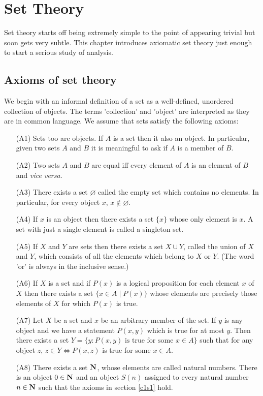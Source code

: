 \chapter{Set Theory}\label{c2}

Set theory starts off being extremely simple to the point of appearing
trivial but soon gets very subtle. This chapter introduces axiomatic set
theory just enough to start a serious study of analysis. 

\section{Axioms of set theory}\label{c2s1}
We begin with an informal definition of a set as a well-defined, unordered
collection of objects. The terms 'collection' and 'object' are interpreted
as they are in common language. We assume that sets satisfy the following
axioms:
\begin{enumerate}
\item[(A1)] Sets too are objects. If $A$ is a set then it also an object.
In particular, given two sets $A$ and $B$ it is meaningful to ask if $A$
is a member of $B$.
\item[(A2)] Two sets $A$ and $B$ are equal iff every element of $A$ is an
element of $B$ and \emph{vice versa}.
\item[(A3)] There exists a set $\varnothing$ called the empty set which
contains no elements. In particular, for every object $x$, $x \notin 
\varnothing$.
\item[(A4)] If $x$ is an object then there exists a set $\{x\}$ whose only
element is $x$. A set with just a single element is called a singleton set. 
\item[(A5)] If $X$ and $Y$ are sets then there exists a set $X \cup Y$, 
called the union of $X$ and $Y$, which consists of all the elements which
belong to $X$ or $Y$. (The word 'or' is always in the inclusive sense.)
\item[(A6)] If $X$ is a set and if $P(x)$ is a logical proposition for 
each element $x$ of $X$ then there exists a set $\{x \in A \;|\; P(x)\}$
whose elements are precisely those elements of $X$ for which $P(x)$ is 
true.
\item[(A7)] Let $X$ be a set and $x$ be an arbitrary member of the set.
If $y$ is any object and we have a statement $P(x, y)$ which is true for
at most $y$. Then there exists a set $Y = \{y: P(x, y) \text{ is true for 
some } x \in A\}$ such that for any object $z$, $z \in Y \Leftrightarrow
P(x, z)$ is true for some $x \in A$.
\item[(A8)] There exists a set $\mathbf{N}$, whose elements are called natural
numbers. There is an object $0 \in \mathbf{N}$ and an object $S(n)$ assigned to
every natural number $n \in \mathbf{N}$ such that the axioms in section 
\ref{c1s1} hold.
\end{enumerate}

